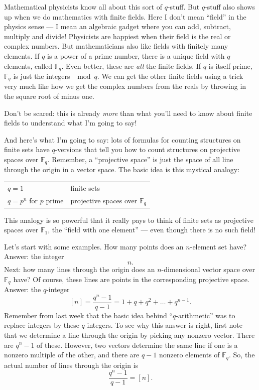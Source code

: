 \documentclass{article}
\begin{document}
Mathematical physicists know all about this sort of \(q\)-stuff. But
\(q\)-stuff also shows up when we do mathematics with finite fields.
Here I don't mean ``field'' in the physics sense --- I mean an algebraic
gadget where you can add, subtract, multiply and divide! Physicists are
happiest when their field is the real or complex numbers. But
mathematicians also like fields with finitely many elements. If \(q\) is
a power of a prime number, there is a unique field with \(q\) elements,
called \(\mathbb{F}_q\). Even better, these are \emph{all} the finite
fields. If \(q\) is itself prime, \(\mathbb{F}_q\) is just the integers
\(\mod q\). We can get the other finite fields using a trick very much
like how we get the complex numbers from the reals by throwing in the
square root of minus one.

Don't be scared: this is already \emph{more} than what you'll need to
know about finite fields to understand what I'm going to say!

And here's what I'm going to say: lots of formulas for counting
structures on finite sets have \(q\)-versions that tell you how to count
structures on projective spaces over \(\mathbb{F}_q\). Remember, a
``projective space'' is just the space of all line through the origin in
a vector space. The basic idea is this mystical analogy:

\begin{longtable}[]{@{}ll@{}}
\toprule
\endhead
\(q=1\) & finite sets\tabularnewline
\(q=p^n\) for \(p\) prime & projective spaces over
\(\mathbb{F}_q\)\tabularnewline
\bottomrule
\end{longtable}

This analogy is so powerful that it really pays to think of finite sets
as projective spaces over \(\mathbb{F}_1\), the ``field with one
element'' --- even though there is no such field!

Let's start with some examples. How many points does an \(n\)-element
set have? Answer: the integer \[n.\] Next: how many lines through the
origin does an \(n\)-dimensional vector space over \(\mathbb{F}_q\)
have? Of course, these lines are points in the corresponding projective
space. Answer: the \(q\)-integer
\[[n] = \frac{q^n-1}{q-1} = 1+q+q^2+\ldots+q^{n-1}.\] Remember from last
week that the basic idea behind ``\(q\)-arithmetic'' was to replace
integers by these \(q\)-integers. To see why this answer is right, first
note that we determine a line through the origin by picking any nonzero
vector. There are \(q^n - 1\) of these. However, two vectors determine
the same line if one is a nonzero multiple of the other, and there are
\(q - 1\) nonzero elements of \(\mathbb{F}_q\). So, the actual number of
lines through the origin is \[\frac{q^n-1}{q-1} = [n].\]
\end{document}
